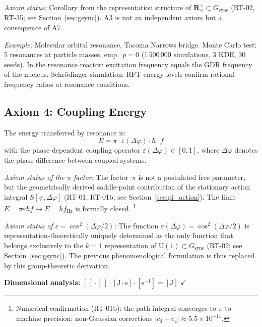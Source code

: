\documentclass[12pt]{iopart}
\providecommand{\mathbb}[1]{\mathbf{#1}}
\begin{document}
	\textit{Axiom status:} Corollary from the representation
	structure of $\mathbb{R}^+_\times \subset G_{\mathrm{sync}}$
	(RT-02, RT-35; see Section~\ref{sec:gsync}).
	A3 is not an independent axiom but a consequence of A7.
	
	\textit{Example:} Molecular orbital resonance,
	Tacoma Narrows bridge.
	Monte Carlo test: 5 resonances at particle masses,
	emp.\ $p = 0$ (1\,500\,000 simulations, 3 KDE, 30 seeds).
	In the resonance reactor: excitation frequency equals
	the GDR frequency of the nucleus.
	Schrödinger simulation: RFT energy levels confirm rational
	frequency ratios at resonance conditions.
	
	\subsection{Axiom 4: Coupling Energy}
	
	The energy transferred by resonance is:
	\begin{equation}
		E = \pi \cdot \varepsilon(\Delta\varphi) \cdot \hbar \cdot f
		\label{eq:grundformel}
	\end{equation}
	with the phase-dependent coupling operator
	$\varepsilon(\Delta\varphi) \in [0,1]$, where
	$\Delta\varphi$ denotes the phase difference between
	coupled systems.
	
	\textit{Axiom status of the $\pi$ factor:} The factor~$\pi$
	is not a postulated free parameter, but the geometrically
	derived saddle-point contribution of the stationary action
	integral $S[\psi, \Delta\varphi]$ (RT-01, RT-01b;
	see Section~\ref{sec:pi_action}).
	The limit $E = \pi\varepsilon\hbar f \to E = hf_{\mathrm{Hz}}$
	is formally closed.%
	\footnote{Numerical confirmation (RT-01b): the path integral
	converges to $\pi$ to machine precision;
	non-Gaussian corrections
	$|c_3 + c_4| \approx 5.5\times10^{-11}$.}
	
	\textit{Axiom status of $\varepsilon = \cos^2(\Delta\varphi/2)$:}
	The function $\varepsilon(\Delta\varphi) = \cos^2(\Delta\varphi/2)$
	is representation-theoretically uniquely determined as the
	only function that belongs exclusively to the $k{=}1$
	representation of $\mathrm{U}(1) \subset G_{\mathrm{sync}}$
	(RT-02; see Section~\ref{sec:gsync}).
	The previous phenomenological formulation is thus replaced by
	this group-theoretic derivation.
	
	\textbf{Dimensional analysis:}
	$[\,] \cdot [\,] \cdot [\mathrm{J{\cdot}s}] \cdot
	[\mathrm{s}^{-1}] = [\mathrm{J}]$ $\checkmark$
	
\end{document}
